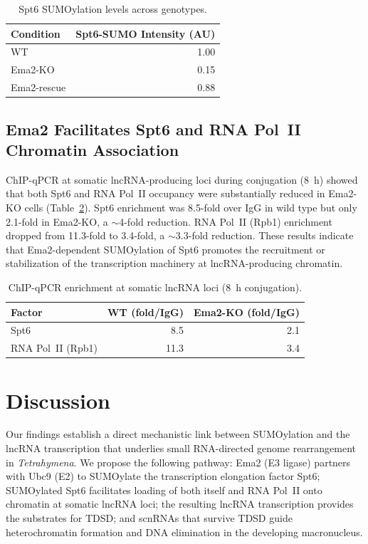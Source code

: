 \documentclass[11pt]{article}
\begin{document}
\begin{table}[ht]
\centering
\caption{Spt6 SUMOylation levels across genotypes.}
\label{tab:sumoylation}
\begin{tabular}{lr}
\toprule
\textbf{Condition} & \textbf{Spt6-SUMO Intensity (AU)} \\
\midrule
WT & 1.00 \\
Ema2-KO & 0.15 \\
Ema2-rescue & 0.88 \\
\bottomrule
\end{tabular}
\end{table}

\subsection{Ema2 Facilitates Spt6 and RNA Pol~II Chromatin Association}

ChIP-qPCR at somatic lncRNA-producing loci during conjugation (8~h) showed that both Spt6 and RNA Pol~II occupancy were substantially reduced in Ema2-KO cells (Table~\ref{tab:chip}). Spt6 enrichment was 8.5-fold over IgG in wild type but only 2.1-fold in Ema2-KO, a $\sim$4-fold reduction. RNA Pol~II (Rpb1) enrichment dropped from 11.3-fold to 3.4-fold, a $\sim$3.3-fold reduction. These results indicate that Ema2-dependent SUMOylation of Spt6 promotes the recruitment or stabilization of the transcription machinery at lncRNA-producing chromatin.

\begin{table}[ht]
\centering
\caption{ChIP-qPCR enrichment at somatic lncRNA loci (8~h conjugation).}
\label{tab:chip}
\begin{tabular}{lrr}
\toprule
\textbf{Factor} & \textbf{WT (fold/IgG)} & \textbf{Ema2-KO (fold/IgG)} \\
\midrule
Spt6 & 8.5 & 2.1 \\
RNA Pol~II (Rpb1) & 11.3 & 3.4 \\
\bottomrule
\end{tabular}
\end{table}

\section{Discussion}

Our findings establish a direct mechanistic link between SUMOylation and the lncRNA transcription that underlies small RNA-directed genome rearrangement in \textit{Tetrahymena}. We propose the following pathway: Ema2 (E3 ligase) partners with Ubc9 (E2) to SUMOylate the transcription elongation factor Spt6; SUMOylated Spt6 facilitates loading of both itself and RNA Pol~II onto chromatin at somatic lncRNA loci; the resulting lncRNA transcription provides the substrates for TDSD; and scnRNAs that survive TDSD guide heterochromatin formation and DNA elimination in the developing macronucleus.
\end{document}
